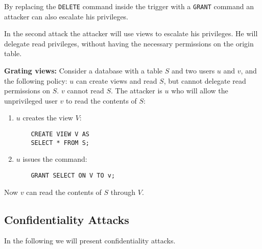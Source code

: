 By replacing the \texttt{DELETE} command inside the trigger with a \texttt{GRANT} command an attacker can also escalate his privileges.

In the second attack the attacker will use views to escalate his privileges. He will delegate read privileges, without having the necessary permissions on the origin table.

\begin{attack}
{\bf Grating views:}
Consider a database with a table $S$ and two users $u$ and $v$, and the following policy: $u$ can create views and read $S$, but cannot delegate read permissions on $S$. $v$ cannot read $S$. The attacker is $u$ who will allow the unprivileged user $v$ to read the contents of $S$:
\begin{enumerate}
\item $u$ creates the view $V$:
	\begin{verbatim}
	CREATE VIEW V AS
	SELECT * FROM S;
	\end{verbatim}
\item $u$ issues the command:
	\begin{verbatim}
	GRANT SELECT ON V TO v;
	\end{verbatim}
\end{enumerate}
Now $v$ can read the contents of $S$ through $V$.
\end{attack}

\subsection{Confidentiality Attacks}

In the following we will present confidentiality attacks.



